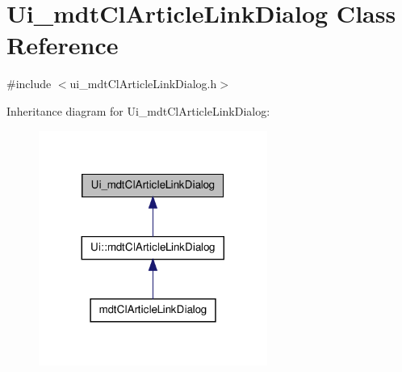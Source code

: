 \hypertarget{class_ui__mdt_cl_article_link_dialog}{\section{Ui\-\_\-mdt\-Cl\-Article\-Link\-Dialog Class Reference}
\label{class_ui__mdt_cl_article_link_dialog}
}


{\ttfamily \#include $<$ui\-\_\-mdt\-Cl\-Article\-Link\-Dialog.\-h$>$}



Inheritance diagram for Ui\-\_\-mdt\-Cl\-Article\-Link\-Dialog\-:
\nopagebreak
\begin{figure}[H]
\begin{center}
\leavevmode
\includegraphics[width=212pt]{class_ui__mdt_cl_article_link_dialog__inherit__graph}
\end{center}
\end{figure}


